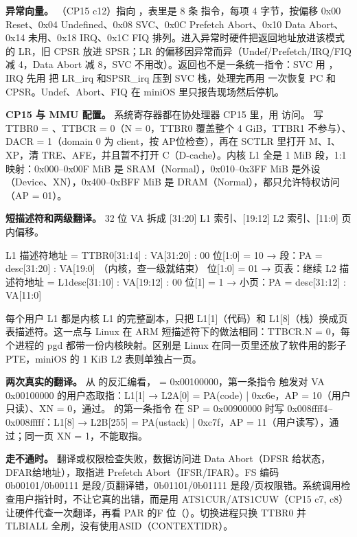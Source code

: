 \textbf{异常向量。} （CP15 c12）指向 ，表里是 8 条 指令，每项 4 字节，按偏移 0x00 Reset、0x04 Undefined、0x08 SVC、0x0C Prefetch Abort、0x10 Data Abort、0x14 未用、0x18 IRQ、0x1C FIQ 排列。进入异常时硬件把返回地址放进该模式的 LR，旧 CPSR 放进 SPSR；LR 的偏移因异常而异（Undef/Prefetch/IRQ/FIQ 减 4，Data Abort 减 8，SVC 不用改）。返回也不是一条统一指令：SVC 用 ，IRQ 先用  把 LR\_irq 和SPSR\_irq 压到 SVC 栈，处理完再用  一次恢复 PC 和 CPSR。Undef、Abort、FIQ 在 miniOS 里只报告现场然后停机。

\textbf{CP15 与 MMU 配置。} 系统寄存器都在协处理器 CP15 里，用 访问。 写 TTBR0 = 、TTBCR = 0（N = 0，TTBR0 覆盖整个 4 GiB，TTBR1 不参与）、DACR = 1（domain 0 为 client，按 AP位检查），再在 SCTLR 里打开 M、I、XP，清 TRE、AFE，并且暂不打开 C（D-cache）。内核 L1 全是 1 MiB 段，1:1 映射：0x000–0x00F MiB 是 SRAM（Normal），0x010–0x3FF MiB 是外设（Device、XN），0x400–0xBFF MiB 是 DRAM（Normal），都只允许特权访问（AP = 01）。

\textbf{短描述符和两级翻译。} 32 位 VA 拆成 [31:20] L1 索引、[19:12] L2 索引、[11:0] 页内偏移。

\begin{txtcode}
L1 描述符地址 = TTBR0[31:14] : VA[31:20] : 00
   位[1:0] = 10 → 段：PA = desc[31:20] : VA[19:0]            （内核，查一级就结束）
   位[1:0] = 01 → 页表：继续
L2 描述符地址 = L1desc[31:10] : VA[19:12] : 00
   位[1]   = 1  → 小页：PA = desc[31:12] : VA[11:0]
\end{txtcode}

每个用户 L1 都是内核 L1 的完整副本，只把 L1[1]（代码）和 L1[8]（栈）换成页表描述符。这一点与 Linux 在 ARM 短描述符下的做法相同：TTBCR.N = 0，每个进程的 pgd 都带一份内核映射。区别是 Linux 在同一页里还放了软件用的影子 PTE，miniOS 的 1 KiB L2 表则单独占一页。

\textbf{两次真实的翻译。} 从  的反汇编看， = 0x00100000，第一条指令 触发对 VA 0x00100000 的用户态取指：L1[1] → L2A[0] = PA(code) | 0xc6e，AP = 10（用户只读）、XN = 0，通过。 的第一条指令 在 SP = 0x00900000 时写 0x008ffff4–0x008fffff：L1[8] → L2B[255] = PA(ustack) | 0xc7f，AP = 11（用户读写），通过；同一页 XN = 1，不能取指。

\textbf{走不通时。} 翻译或权限检查失败，数据访问进 Data Abort（DFSR 给状态，DFAR给地址），取指进 Prefetch Abort（IFSR/IFAR）。FS 编码 0b00101/0b00111 是段/页翻译错，0b01101/0b01111 是段/页权限错。系统调用检查用户指针时，不让它真的出错，而是用 ATS1CUR/ATS1CUW（CP15 c7, c8）让硬件代查一次翻译，再看 PAR 的F 位（）。切换进程只换 TTBR0 并 TLBIALL 全刷，没有使用ASID（CONTEXTIDR）。



